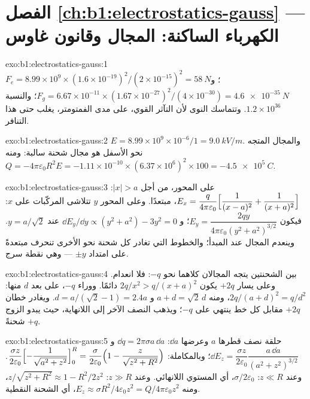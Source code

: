 \section*{الفصل \ref{ch:b1:electrostatics-gauss} --- الكهرباء الساكنة: المجال وقانون غاوس}

\begin{solution}{exo:b1:electrostatics-gauss:1}
$F_e = 8.99 \times 10^9 \times (1.6 \times 10^{-19})^2/(2 \times 10^{-15})^2 = \qty{58}{N}$؛
و $F_g = 6.67 \times 10^{-11} \times (1.67 \times 10^{-27})^2/(4 \times 10^{-30}) =
\qty{4.6e-35}{N}$؛ والنسبة $1.2 \times 10^{36}$. وتتماسك النوى لأن التآثر
القوي، على مدى الفمتومتر، يغلب حتى هذا التنافر.
\end{solution}

\begin{solution}{exo:b1:electrostatics-gauss:2}
$E = 8.99 \times 10^9 \times 10^{-6}/1 = \qty{9.0}{kV/m}$. والمجال المتجه نحو الأسفل هو
مجال شحنة سالبة: ومنه $Q = -4\pi\varepsilon_0R^2E = -1.11 \times 10^{-10} \times
(6.37 \times 10^6)^2 \times 100 = \qty{-4.5e5}{C}$.
\end{solution}

\begin{solution}{exo:b1:electrostatics-gauss:3}
على المحور، من أجل $|x| > a$: $E_x = \dfrac{q}{4\pi\varepsilon_0}\Bigl[\dfrac{1}{(x - a)^2} +
\dfrac{1}{(x + a)^2}\Bigr]$، مبتعدًا. وعلى المحور $y$ تتلاشى المركّبات على $x$:
فيكون $E_y = \dfrac{2qy}{4\pi\varepsilon_0(y^2 + a^2)^{3/2}}$؛ و $\dd E_y/\dd y \propto
(y^2 + a^2) - 3y^2 = 0$ عند $y = a/\sqrt2$. وينعدم المجال عند المبدأ؛
والخطوط التي تغادر كل شحنة نحو الأخرى تنحرف مبتعدةً على امتداد
$\pm y$ --- وهي نقطة سرج.
\end{solution}

\begin{solution}{exo:b1:electrostatics-gauss:4}
بين الشحنتين يتجه المجالان كلاهما نحو $-q$: فلا انعدام. وعلى يسار
$+2q$ يكون $2q/x^2 > q/(x + a)^2$ دائمًا. ووراء $-q$، على بعد $d$
منها: $2q/(a + d)^2 = q/d^2$، ومنه $a + d = \sqrt2\,d$ و $d = a/(\sqrt2 - 1) = 2.4a$.
ويغادر خطان $+2q$ مقابل كل خط ينتهي على $-q$؛ ويذهب النصف الآخر إلى
اللانهاية، حيث يبدو الزوج شحنةً $+q$.
\end{solution}

\begin{solution}{exo:b1:electrostatics-gauss:5}
حلقة نصف قطرها $a$ وعرضها $\dd a$: $\dd q = 2\pi\sigma a\,\dd a$ و $\dd E_z =
\dfrac{\sigma z}{2\varepsilon_0}\dfrac{a\,\dd a}{(a^2 + z^2)^{3/2}}$؛ وبالمكاملة:
$\dfrac{\sigma z}{2\varepsilon_0}\Bigl[-\dfrac{1}{\sqrt{a^2 + z^2}}\Bigr]_0^R = \dfrac{\sigma}{2\varepsilon_0}
\Bigl(1 - \dfrac{z}{\sqrt{z^2 + R^2}}\Bigr)$. وعند $z \ll R$: $\sigma/2\varepsilon_0$، أي
المستوي اللانهائي. وعند $z \gg R$: $z/\sqrt{z^2 + R^2} \approx 1 - R^2/2z^2$، ومنه $E_z
\approx \sigma R^2/4\varepsilon_0z^2 = Q/4\pi\varepsilon_0z^2$، أي الشحنة النقطية.
\end{solution}

